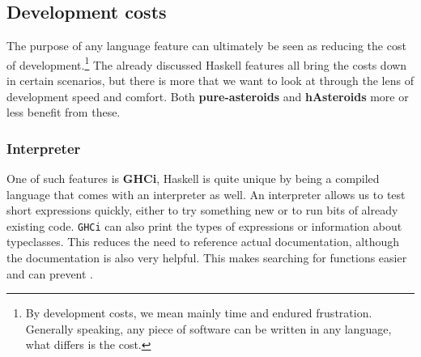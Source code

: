 \documentclass[
  digital, %
  color,   %
  table,   %
  oneside, %
  lof,     %
  lot,     %
]{fithesis3}
\begin{document}
{\subsection{Development costs}

The purpose of any language feature can ultimately be seen as reducing the cost of development.\footnote{
By development costs, we mean mainly time and endured frustration. Generally speaking,
any piece of software can be written in any language, what differs is the cost.
}
The already discussed Haskell features all bring the costs down in certain scenarios, but there is more
that we want to look at through the lens of development speed and comfort.
Both \textbf{pure-asteroids} and \textbf{hAsteroids} more or less benefit from these.

\subsubsection{Interpreter}
One of such features is \textbf{GHCi}, \cite{ghciwiki}
Haskell is quite unique by being a compiled language that comes with an interpreter as well.
An interpreter allows us to test short expressions quickly, either to try something new or to
run bits of already existing code. \texttt{GHCi} can also print the types of expressions
or information about typeclasses. This reduces the need to reference actual documentation,
although the documentation is also very helpful. \cite{hoogle} This makes searching for functions easier
and can prevent .

}
\end{document}
